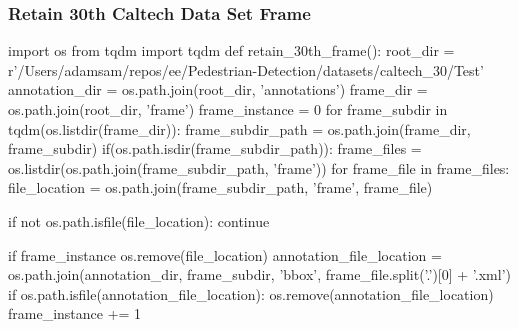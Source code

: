 \subsubsection{Retain 30th Caltech Data Set Frame}\label{appendix:caltech_30_frame}
\begin{pythoncode}
import os
from tqdm import tqdm
def retain_30th_frame():
    root_dir = r'/Users/adamsam/repos/ee/Pedestrian-Detection/datasets/caltech_30/Test'
    annotation_dir = os.path.join(root_dir, 'annotations')
    frame_dir = os.path.join(root_dir, 'frame')
    frame_instance = 0
    for frame_subdir in tqdm(os.listdir(frame_dir)):
        frame_subdir_path = os.path.join(frame_dir, frame_subdir)
        if(os.path.isdir(frame_subdir_path)):
            frame_files = os.listdir(os.path.join(frame_subdir_path, 'frame'))
            for frame_file in frame_files:
                file_location = os.path.join(frame_subdir_path, 'frame', frame_file)
    
                if not os.path.isfile(file_location):
                    continue
    
                if frame_instance %
                    os.remove(file_location)
                    annotation_file_location = os.path.join(annotation_dir, frame_subdir, 'bbox', frame_file.split('.')[0] + '.xml')
                    if os.path.isfile(annotation_file_location):
                        os.remove(annotation_file_location)
                frame_instance += 1
\end{pythoncode}
